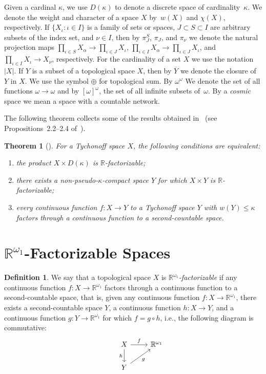 \documentclass[a4paper,12pt]{amsart}
\newtheorem{theoremA}{Theorem}
\theoremstyle{definition}
\newtheorem{definition}{Definition}[section]
\theoremstyle{remark}
\begin{document}
Given a cardinal $\kappa$, we use $D(\kappa)$ to denote a discrete space of cardinality~$\kappa$. 
We denote the 
weight and character of a space $X$ by~$w(X)$ and $\chi(X)$, respectively. 
If $\{X_\iota: \iota\in I\}$ is a family of sets or spaces,
$J\subset S\subset I$ are arbitrary subsets of the index set, and $\nu\in I$, then by 
$\pi_J^S$, $\pi_J$, and $\pi_\nu$ 
we denote the natural projection maps 
$\prod_{\iota\in S}X_\alpha \to \prod_{\iota\in J}X_\iota$,
$\prod_{\iota\in I}X_\alpha \to \prod_{\iota\in J}X_\iota$, and $\prod_{\iota\in I}X_\iota \to X_\nu$, 
respectively. 
For the cardinality of a set $X$ we use the notation $|X|$. If 
$Y$ is a subset of a topological space 
$X$, then by $\overline Y$ we denote the closure of $Y$ in $X$. We use the symbol $\oplus$ for topological sum. 
By $\omega^\omega$ We denote the set of all functions $\omega\to \omega$ and by $[\omega]^\omega$, the set of all 
infinite subsets of~$\omega$. By a \emph{cosmic} space we mean a space with a countable network.

The following theorem collects some of the results obtained in~\cite{R-S_2025} (see 
Propositions~2.2--2.4 of~\cite{R-S_2025}). 

\begin{theoremA}[\cite{R-S_2025}]
\label{Theorem_A}
For a Tychonoff space $X$, the following conditions are equivalent:
\begin{enumerate}
\item[\rm(1)]
the product $X\times D(\kappa)$ is $\mathbb R$-factorizable; 
\item[\rm(2)]
there exists a non-pseudo-$\kappa$-compact space $Y$ for which $X\times Y$ is $\mathbb R$-factorizable; 
\item[\rm(3)] 
every continuous function $f\colon X\to Y$ to a Tychonoff space $Y$ with $w(Y)\leq\kappa$ factors 
through a continuous function to a second-countable space.
\end{enumerate} 
\end{theoremA}

\section{$\mathbb R^{\omega_1}$-Factorizable Spaces}

\begin{definition}
We say that a topological space $X$ is \emph{$\mathbb R^{\omega_1}$-factorizable} if any continuous function  
$f\colon X\to \mathbb R^{\omega_1}$ factors through a continuous function to a second-countable space, 
that is, given any continuous function $f\colon X\to \mathbb R^{\omega_1}$, there exists 
a second-countable space $Y$, a continuous function $h\colon X \to Y$, and a continuous function 
$g\colon Y\to \mathbb R^{\omega_1}$ for which $f = g \circ h$, i.e., the following diagram is commutative:
$$
\begin{tikzcd} 
&X \arrow[r, "f"]  \arrow[d, "h"']   & \mathbb R^{\omega_1} \\ 
&Y \arrow[ru, "g"'] &
\end{tikzcd} 
$$
\end{definition}
\end{document}
